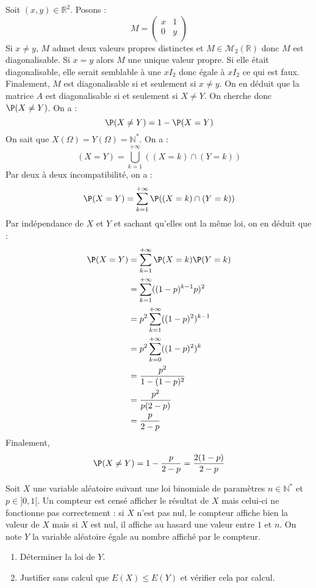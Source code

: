 \documentclass[a4paper,10pt]{report}
\begin{document}
\corr Soit $(x,y) \in \mathbb{R}^2$. Posons :
$$ M = \begin{pmatrix}
x & 1 \\
0 & y \\
\end{pmatrix}$$
Si $x \neq y$, $M$ admet deux valeurs propres distinctes et $M \in \mathcal{M}_2(\mathbb{R})$ donc $M$ est diagonalisable. Si $x=y$ alors $M$ une unique valeur propre. Si elle était diagonalisable, elle serait semblable à une $x I_2$ donc égale à $x I_2$ ce qui est faux. Finalement, $M$ est diagonalisable si et seulement si $x \ne y$. On en déduit que la matrice $A$ est diagonalisable si et seulement si $X \neq Y$. On cherche donc $\P(X \neq Y)$. On a :
$$ \P(X \neq Y) = 1 - \P(X=Y)$$
On sait que $X(\Omega)= Y(\Omega)= \mathbb{N}^*$. On a :
$$ (X=Y) = \bigcup_{k=1}^{+ \infty} ((X=k) \cap (Y=k))$$
Par deux à deux incompatibilité, on a :
$$  \P(X=Y) = \sum_{k=1}^{+ \infty} \P((X=k) \cap (Y=k))$$
Par indépendance de $X$ et $Y$ et sachant qu'elles ont la même loi, on en déduit que :
\begin{align*}
 \P(X=Y) & = \sum_{k=1}^{+ \infty} \P(X=k) \P(Y=k) \\
 & = \sum_{k=1}^{+ \infty} ((1-p)^{k-1} p)^2 \\
 & = p^2 \sum_{k=1}^{+ \infty} ((1-p)^{2})^{k-1} \\
 & = p^2 \sum_{k=0}^{+ \infty} ((1-p)^{2})^{k} \\
 & = \dfrac{p^2}{1-(1-p)^{2}}\\
 & = \dfrac{p^2}{p(2-p)} \\
 & = \dfrac{p}{2-p}
\end{align*}
Finalement,
$$ \P(X \neq Y) = 1 - \dfrac{p}{2-p} = \dfrac{2(1-p)}{2-p}$$

\begin{Exa} Soit $X$ une variable aléatoire suivant une loi binomiale de paramètres $n \in \mathbb{N}^*$ et $p \in ]0,1[$. Un compteur est censé afficher le résultat de $X$ mais celui-ci ne fonctionne pas correctement : si $X$ n'est pas nul, le compteur affiche bien la valeur de $X$ mais si $X$ est nul, il affiche au hasard une valeur entre $1$ et $n$. On note $Y$ la variable aléatoire égale au nombre affiché par le compteur.

\begin{enumerate}
\item Déterminer la loi de $Y$.
\item Justifier sans calcul que $E(X) \leq E(Y)$ et vérifier cela par calcul.
\end{enumerate}
\end{Exa}
\end{document}
